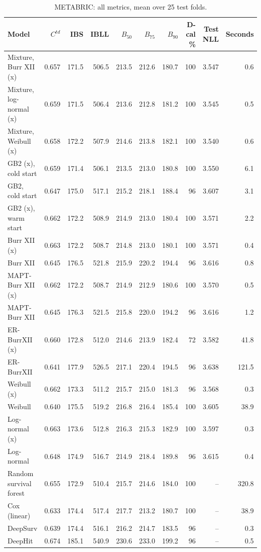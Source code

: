 \begin{table}[htbp]
\centering
\caption{METABRIC: all metrics, mean over 25 test folds.}\label{stab:real_metabric}
\footnotesize
\begin{tabular}{lrrrrrrrrr}
\toprule
Model & $C^{td}$ & IBS & IBLL & $B_{50}$ & $B_{75}$ & $B_{90}$ & D-cal \% & Test NLL & Seconds \\
\midrule
Mixture, Burr XII (x) & 0.657 & 171.5 & 506.5 & 213.5 & 212.6 & 180.7 & 100 & 3.547 & 0.6 \\
Mixture, log-normal (x) & 0.659 & 171.5 & 506.4 & 213.6 & 212.8 & 181.2 & 100 & 3.545 & 0.5 \\
Mixture, Weibull (x) & 0.658 & 172.2 & 507.9 & 214.6 & 213.8 & 182.1 & 100 & 3.540 & 0.6 \\
GB2 (x), cold start & 0.659 & 171.4 & 506.1 & 213.5 & 213.0 & 180.8 & 100 & 3.550 & 6.1 \\
GB2, cold start & 0.647 & 175.0 & 517.1 & 215.2 & 218.1 & 188.4 & 96 & 3.607 & 3.1 \\
GB2 (x), warm start & 0.662 & 172.2 & 508.9 & 214.9 & 213.0 & 180.4 & 100 & 3.571 & 2.2 \\
Burr XII (x) & 0.663 & 172.2 & 508.7 & 214.8 & 213.0 & 180.1 & 100 & 3.571 & 0.4 \\
Burr XII & 0.645 & 176.5 & 521.8 & 215.9 & 220.2 & 194.4 & 96 & 3.616 & 0.8 \\
MAPT-Burr XII (x) & 0.662 & 172.2 & 508.7 & 214.9 & 212.9 & 180.6 & 100 & 3.570 & 0.5 \\
MAPT-Burr XII & 0.645 & 176.3 & 521.5 & 215.8 & 220.0 & 194.2 & 96 & 3.616 & 1.2 \\
ER-BurrXII (x) & 0.660 & 172.8 & 512.0 & 214.6 & 213.9 & 182.4 & 72 & 3.582 & 41.8 \\
ER-BurrXII & 0.641 & 177.9 & 526.5 & 217.1 & 220.4 & 194.5 & 96 & 3.638 & 121.5 \\
Weibull (x) & 0.662 & 173.3 & 511.2 & 215.7 & 215.0 & 181.3 & 96 & 3.568 & 0.3 \\
Weibull & 0.640 & 175.5 & 519.2 & 216.8 & 216.4 & 185.4 & 100 & 3.605 & 38.9 \\
Log-normal (x) & 0.663 & 173.6 & 512.8 & 216.3 & 215.3 & 182.9 & 100 & 3.597 & 0.3 \\
Log-normal & 0.648 & 174.9 & 516.7 & 214.9 & 218.4 & 189.8 & 96 & 3.615 & 0.4 \\
Random survival forest & 0.655 & 172.9 & 510.4 & 215.7 & 214.6 & 184.0 & 100 & -- & 320.8 \\
Cox (linear) & 0.633 & 174.4 & 517.4 & 217.7 & 213.2 & 180.7 & 100 & -- & 38.9 \\
DeepSurv & 0.639 & 174.4 & 516.1 & 216.2 & 214.7 & 183.5 & 96 & -- & 0.3 \\
DeepHit & 0.674 & 185.1 & 540.9 & 230.6 & 233.0 & 199.2 & 96 & -- & 0.5 \\
\bottomrule
\end{tabular}


\end{table}
